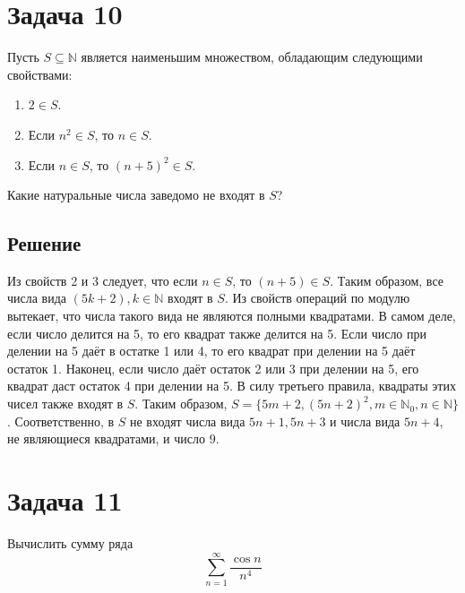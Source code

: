 \documentclass[11pt]{article}
\def\zall{\setcounter{lem}{0}\setcounter{cnsqnc}{0}\setcounter{th}{0}\setcounter{Cmt}{0}\setcounter{equation}{0}}
\newcounter{lem}\setcounter{lem}{0}
\newcounter{th}\setcounter{th}{0}
\newcounter{cnsqnc}\setcounter{cnsqnc}{0}
\newcounter{Cmt}\setcounter{Cmt}{0}
\begin{document}
\section{Задача 10}
\label{sec:org7904b75}
\zall
Пусть \(S \subseteq \mathbb{N}\) является наименьшим множеством, обладающим следующими свойствами:
\begin{enumerate}
\item \(2 \in S\).
\item Если \(n^2 \in S\), то \(n \in S\).
\item Если \(n \in S\), то \((n + 5)^2 \in S\).
\end{enumerate}
Какие натуральные числа заведомо не входят в \(S\)?
\subsection{Решение}
\label{sec:org396f931}
Из свойств 2 и 3 следует, что если \(n \in S\), то \((n + 5) \in S\). Таким образом, все числа вида \((5k + 2), k \in \mathbb{N}\) входят в \(S\). Из свойств операций по модулю вытекает, что числа такого вида не являются полными квадратами. В самом деле, если число делится на 5, то его квадрат также делится на 5. Если число при делении на 5 даёт в остатке 1 или 4, то его квадрат при делении на 5 даёт остаток 1. Наконец, если число даёт остаток 2 или 3 при делении на 5, его квадрат даст остаток 4 при делении на 5. В силу третьего правила, квадраты этих чисел также входят в \(S\). Таким образом, \(S = \{5m + 2, (5n + 2)^2, m \in \mathbb{N}_0, n \in \mathbb{N}\}\). Соответственно, в \(S\) не входят числа вида \(5n + 1, 5n + 3\) и числа вида \(5n + 4\), не являющиеся квадратами, и число \(9\).
\pagebreak
\section{Задача 11}
\label{sec:org570a60c}
\zall
Вычислить сумму ряда
\begin{equation}
\sum_{n = 1}^{\infty}\frac{\cos n}{n^4}
\end{equation}
\end{document}
